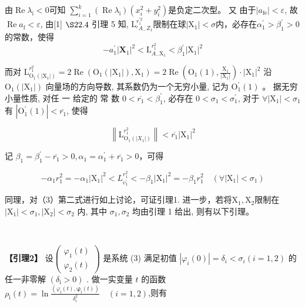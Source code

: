 \documentclass[12pt,a4paper,UTF8]{ctexart}
\begin{document}
由$\operatorname{Re} \lambda_{\mathrm{i}}<0$可知 $\sum\limits_{i=1}^{k}\left(\operatorname{Re} \lambda_{\mathrm{i}}\right)\left(x_{i}^{2}+y_{i}^{2}\right) $是负定二次型。
又 由于$\left|a_{\mathrm{fe}} \right|<\varepsilon$, 故$\operatorname{Re} a_{\mathrm{f}} <\varepsilon $, 
由[1]  $ \S 22.4 $ 引理 5 知, $\mathrm{L}_{{ }^{c} A_{-} Z_{1}}^{r_{1}^{\prime 2}}$限制在球$|\mathrm{X}_1|<\sigma$内，必存在$\alpha^{\prime}_{1}>\beta^{\prime}_{1}>0$的常数，使得
$$-a_1^{\prime}\left|\mathbf{X}_1\right|^2<\mathrm{L}_{A_{-} \mathrm{X}_1}^{r_1^2}<\beta_1^{\prime}\left|\mathrm{X}_1\right|^2$$

而对 $\mathrm{L}_{\mathrm{O}_1\left(\left|\mathrm{X}_1\right|\right)}^{r_1^2}=2 \operatorname{Re}\left(\mathrm{O}_1\left(\left|\mathrm{X}_1\right|\right), \mathrm{X}_1\right)=2 \operatorname{Re}\left(\mathrm{O}_1(1), \frac{\mathrm{X}_1}{\left|\mathrm{X}_1\right|}\right) \cdot
\left|\mathrm{X}_1\right|^2$ 沿 $\mathrm{O}_1\left(\left|\mathrm{X}_1\right|\right)$ 向量场的方向导数, 其系数仍为一个无穷小量, 记为 $\mathrm{O}_1^{\prime}(1)$ 。
据无穷小量性质, 对任 一 给定的 常 数 $0<\overline{r_1}<\beta_1^{\prime}$, 必存在 $0<\sigma_1<\sigma_1^{\prime}$, 对于 $\forall\left|\mathrm{X}_1\right|<\sigma_1$ 有 $|\mathrm{O}_1^{\prime}(1)|<\overline{r_1}$, 使得

$$\left\|\mathrm{L}_{\mathrm{O}_1\left(\left|X_1\right|\right)} ^{r_1^2} \right\|<\overline{r_1}\left|\mathrm{X}_1\right|^2$$

记 $\beta_1=\beta_1^{\prime}-\overline{r_1}>0, \alpha_1=\alpha_1^{\prime}+\overline{r_1}>0$，可得

$$-\alpha_1 r_1^2=-\alpha_1\left|\mathrm{X}_1\right|^2<L_{v_1^{\prime}}^{r_1^2}<-\beta_1\left|\mathrm{X}_1\right|^2=-\beta_1 r_1^2 \quad\left(\forall\left|\mathrm{X}_1\right|<\sigma_1\right)$$

同理，对（3）第二式进行如上讨论，可证引理1. 进一步，若将$\mathrm{X}_1,\mathrm{X}_2$限制在 $\left|\mathrm{X}_1\right|<\sigma_1,\left|\mathrm{X}_2\right|<\sigma_2$ 内, 其中 $\sigma_1, \sigma_2$ 均由引理 1 给出, 则有以下引理。







\begin{spacing}{1.3}
	~
\end{spacing}
\textbf{【引理2】}
设$\left(\begin{array}{l}\varphi_1(t) \\ \varphi_2(t)\end{array}\right)$ 是系统 (3) 满足初值 $\left|\varphi_i(0)\right|=\delta_i<\sigma_i(i=1,2)$ 的任一非零解
$\left(\delta_{\mathrm{i}}>0\right)$ . 做一实变量 $t$ 的函数 $\rho_{\mathrm{i}}(t)=\ln \frac{\left(\varphi_{\mathrm{i}}(t), \boldsymbol{\varphi}_{\mathrm{i}}(t)\right)}{\delta_i^2} \quad(i=1,2)$,则有
\end{document}
